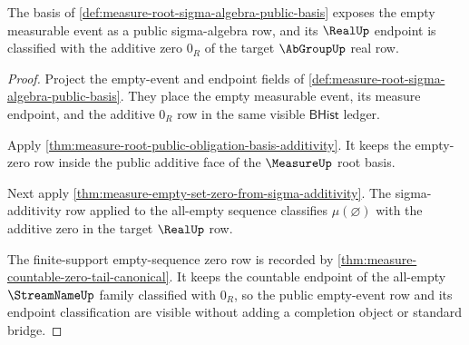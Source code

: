 \begin{theorem}
\label{thm:measure-root-empty-event-zero-public-row}
The basis of \autoref{def:measure-root-sigma-algebra-public-basis} exposes
the empty measurable event as a public sigma-algebra row, and its
$\RealUp$ endpoint is classified with the additive zero $0_R$ of the target
$\AbGroupUp$ real row.
\end{theorem}
\begin{proof}
Project the empty-event and endpoint fields of
\autoref{def:measure-root-sigma-algebra-public-basis}. They place the
empty measurable event, its measure endpoint, and the additive $0_R$ row in
the same visible $\mathsf{BHist}$ ledger.

Apply \autoref{thm:measure-root-public-obligation-basis-additivity}. It
keeps the empty-zero row inside the public additive face of the
$\MeasureUp$ root basis.

Next apply \autoref{thm:measure-empty-set-zero-from-sigma-additivity}. The
sigma-additivity row applied to the all-empty sequence classifies
$\mu(\varnothing)$ with the additive zero in the target $\RealUp$ row.

The finite-support empty-sequence zero row is recorded by
\autoref{thm:measure-countable-zero-tail-canonical}. It keeps the
countable endpoint of the all-empty $\StreamNameUp$ family classified with
$0_R$, so the public empty-event row and its endpoint classification are
visible without adding a completion object or standard bridge.
\end{proof}

